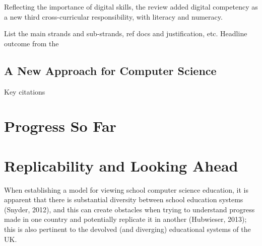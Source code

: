 \documentclass[sigconf]{acmart}
\begin{document}
Reflecting the importance of digital skills, the review added digital
competency as a new third cross-curricular responsibility, with
literacy and numeracy.

List the main strands and sub-strands, ref docs and justification,
etc. Headline outcome from the 


\subsection{A New Approach for Computer Science}

Key citations~\cite{crick+moller:wipsce2015,moller+crick:jce2018}

\section{Progress So Far}

\section{Replicability and Looking Ahead}

When establishing a model for viewing school computer science
education, it is apparent that there is substantial diversity between
school education systems (Snyder, 2012), and this can create obstacles
when trying to understand progress made in one country and potentially
replicate it in another (Hubwieser, 2013); this is also pertinent to
the devolved (and diverging) educational systems of the UK.








 
\end{document}
